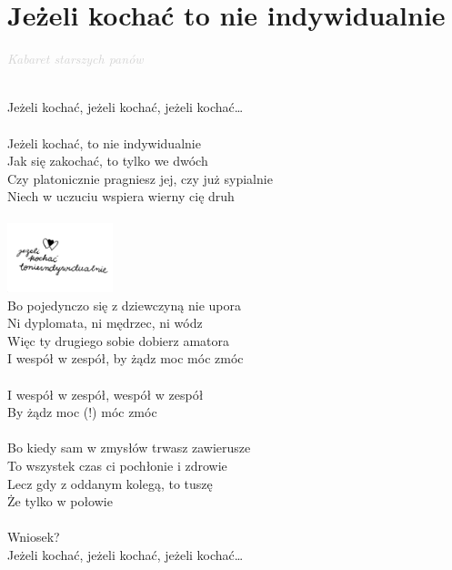 \documentclass[a5paper, 10pt]{book}
\begin{document}
\newpage
\section{Jeżeli kochać to nie indywidualnie}\textcolor{lightgray}{\textit{Kabaret starszych panów}}\\~\\
\begin{minipage}[t]{0.8\textwidth}
  \hspace*{4mm}Jeżeli kochać, jeżeli kochać, jeżeli kochać…\\
  \\
  Jeżeli kochać, to nie indywidualnie\\
  Jak się zakochać, to tylko we dwóch\\
  Czy platonicznie pragniesz jej, czy już sypialnie\\
  Niech w uczuciu wspiera wierny cię druh\\
  \\
  \includegraphics[height=2cm, right]{images/jezeli_kochac.png}\vspace*{-20.5mm}\\
  Bo pojedynczo się z dziewczyną nie upora\\
  Ni dyplomata, ni mędrzec, ni wódz\\
  Więc ty drugiego sobie dobierz amatora\\
  I wespół w zespół, by żądz moc móc zmóc\\
  \\
  \hspace*{8mm}I wespół w zespół, wespół w zespół\\
  \hspace*{8mm}By żądz moc (!) móc zmóc\\
  \\
  Bo kiedy sam w zmysłów trwasz zawierusze\\
  To wszystek czas ci pochłonie i zdrowie\\
  Lecz gdy z oddanym kolegą, to tuszę\\
  Że tylko w połowie\\
  \\
  \hspace*{4mm}Wniosek?\\
  \hspace*{4mm}Jeżeli kochać, jeżeli kochać, jeżeli kochać…\\

\end{minipage}
\end{document}
